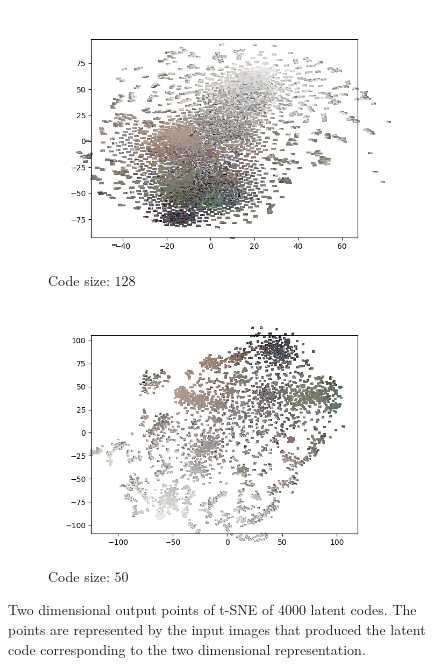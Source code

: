\begin{figure}[H]
\begin{subfigure}{.5\textwidth}
        \centering
        \includegraphics[width=\textwidth]{images/figures/experiments_latent/convolutional_dim1024_images.png}   
        \caption{Code size: $128$}
    \end{subfigure}%
    \begin{subfigure}{.5\textwidth}
        \centering
        \includegraphics[width=\textwidth]{images/figures/experiments_latent/convolutional_dim50_images.png}
        \caption{Code size: $50$}
    \end{subfigure}
    \caption{Two dimensional output points of t-SNE of $4000$ latent codes. The points are represented by the input
    images that produced the latent code corresponding to the two dimensional representation.}
\end{figure}





